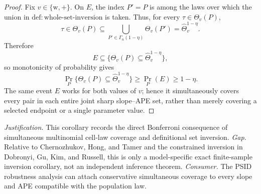 \documentclass{article}
\begin{document}
\begin{proof}
Fix \(v\in\{\mathrm w,+\}\).  On \(E\), the index \(P'=P\) is among the laws over which the union in \(\mathrm{def{:}whole\text{-}set\text{-}inversion}\) is taken.  Thus, for every \(\tau\in\Theta_v(P)\),
\[
 \tau\in\Theta_v(P)
 \subseteq
 \bigcup_{P'\in\Gamma_n(1-\eta)}\Theta_v(P')
 =\widehat\Theta_v^{1-\eta}.
\]
Therefore
\[
 E\subseteq
 \{\Theta_v(P)\subseteq\widehat\Theta_v^{1-\eta}\},
\]
so monotonicity of probability gives
\[
 \Pr_P\{\Theta_v(P)\subseteq\widehat\Theta_v^{1-\eta}\}
 \geq \Pr_P(E)\geq1-\eta.
\]
The same event \(E\) works for both values of \(v\); hence it simultaneously covers every pair in each entire joint sharp slope--APE set, rather than merely covering a selected endpoint or a single parameter value.
\end{proof}
\par\smallskip\noindent \textit{Justification.} This corollary records the direct Bonferroni consequence of simultaneous multinomial cell-law coverage and definitional set inversion. \textit{Gap.} Relative to Chernozhukov, Hong, and Tamer and the constrained inversion in Dobronyi, Gu, Kim, and Russell, this is only a model-specific exact finite-sample inversion corollary, not an independent inference theorem. \textit{Consumer.} The PSID robustness analysis can attach conservative simultaneous coverage to every slope and APE compatible with the population law.
\end{document}
